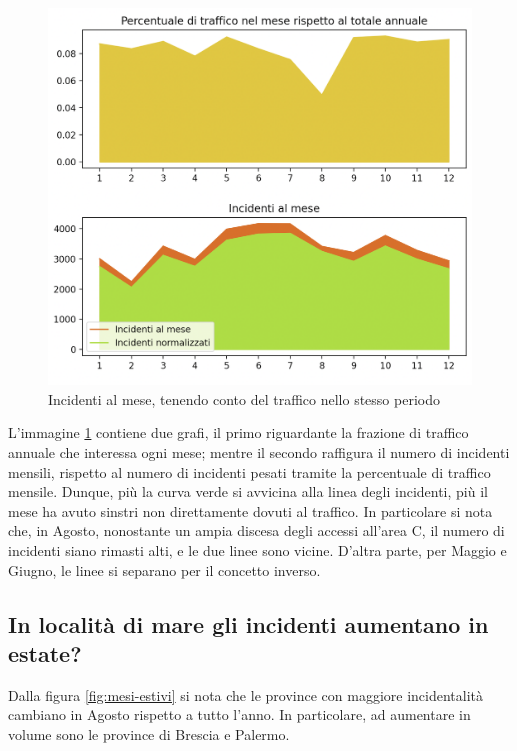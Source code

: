 \documentclass[a4paper]{report}
\begin{document}
\begin{figure}
    \includegraphics[width=\linewidth]{../src/area_c/incidenti_traffico_mese.png}
    \caption{Incidenti al mese, tenendo conto del traffico nello stesso periodo}
    \label{fig:incidenti-traffico-mese}
\end{figure}

L'immagine \ref{fig:incidenti-traffico-mese} contiene due grafi, 
il primo riguardante la frazione di traffico annuale che interessa ogni mese; 
mentre il secondo raffigura il numero di incidenti mensili, rispetto al numero di incidenti pesati 
tramite la percentuale di traffico mensile.
Dunque, più la curva verde si avvicina alla linea degli incidenti, più il mese ha avuto sinstri 
non direttamente dovuti al traffico.
In particolare si nota che, in Agosto, nonostante un ampia discesa degli accessi all'area C, 
il numero di incidenti siano rimasti alti, e le due linee sono vicine.
D'altra parte, per Maggio e Giugno, le linee si separano per il concetto inverso.

\subsection{In località di mare gli incidenti aumentano in estate?}

Dalla figura \ref{fig:mesi-estivi} si nota che le province con maggiore incidentalità 
cambiano in Agosto rispetto a tutto l'anno. In particolare, ad aumentare in volume sono le 
province di Brescia e Palermo.
\end{document}
